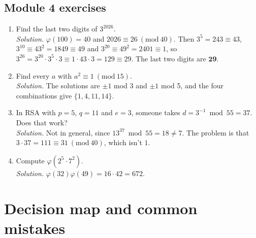 \documentclass[11pt,a4paper]{article}
\theoremstyle{definition}
\newcommand{\md}[1]{\ (\mathrm{mod}\ #1)}
\theoremstyle{noteit}
\theoremstyle{note}
\begin{document}
\subsection*{Module 4 exercises}
\begin{enumerate}[label=\textbf{4.\arabic*}]
\item Find the last two digits of $3^{2026}$.\\
\emph{Solution.} $\varphi(100)=40$ and $2026\equiv26\md{40}$. Then $3^{5}=243\equiv43$, $3^{10}\equiv43^2=1849\equiv49$ and $3^{20}\equiv49^2=2401\equiv1$, so $3^{26}=3^{20}\cdot3^5\cdot3\equiv1\cdot43\cdot3=129\equiv29$. The last two digits are $\mathbf{29}$.
\item Find every $a$ with $a^2\equiv1\md{15}$.\\
\emph{Solution.} The solutions are $\pm1$ mod 3 and $\pm1$ mod 5, and the four combinations give $\{1,4,11,14\}$.
\item In RSA with $p=5$, $q=11$ and $e=3$, someone takes $d=3^{-1}\bmod55=37$. Does that work?\\
\emph{Solution.} Not in general, since $13^{37}\bmod55=18\neq7$. The problem is that $3\cdot37=111\equiv31\md{40}$, which isn't $1$.
\item Compute $\varphi(2^5\cdot 7^2)$.\\
\emph{Solution.} $\varphi(32)\varphi(49)=16\cdot42=672$.
\end{enumerate}

\newpage
\section{Decision map and common mistakes}
\end{document}
